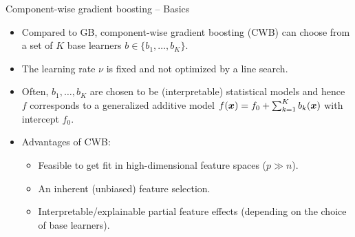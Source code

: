 \documentclass[10pt]{beamer}
\begin{document}
\begin{frame}{Component-wise gradient boosting -- Basics}
  \begin{itemize}
    \item
      Compared to GB, component-wise gradient boosting (CWB) can choose from a set of $K$ base learners $b \in \{b_1, \dots, b_K\}$.

    \item
      The learning rate $\nu$ is fixed and not optimized by a line search.

    \item
      Often, $b_1, \dots, b_K$ are chosen to be (interpretable) statistical models and hence $f$ corresponds to a generalized additive model $f(\bm{x}) = f_0 + \sum_{k=1}^K b_k(\bm{x})$ with intercept $f_0$.

    \item
      Advantages of CWB:
      \begin{itemize}
        \item
          Feasible to get fit in high-dimensional feature spaces ($p \gg n$).

        \item
          An inherent (unbiased) feature selection.

        \item
          Interpretable/explainable partial feature effects (depending on the choice of base learners).
      \end{itemize}
  \end{itemize}
\end{frame}
\end{document}

